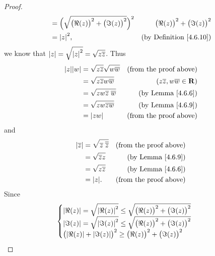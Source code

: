 \begin{proof}
\begin{align*}
                       & = \Big(\sqrt{\big(\Re(z)\big)^2 + \big(\Im(z)\big)^2}\Big)^2                                    & \big(\Re(z)\big)^2 + \big(\Im(z)\big)^2 \\
                       & = \abs{z}^2,                                                                                    & \text{(by Definition \ref{4.6.10})}
    \end{align*}
    we know that \(\left\lvert z\right\rvert = \sqrt{\left\lvert z\right\rvert^2} = \sqrt{z \overline{z}}\).
    Thus
    \begin{align*}
        \abs{z} \abs{w} & = \sqrt{z \overline{z}} \sqrt{w \overline{w}} & \text{(from the proof above)}           \\
                        & = \sqrt{z \overline{z} w \overline{w}}        & (z \overline{z}, w \overline{w} \in \R) \\
                        & = \sqrt{zw \overline{z} \; \overline{w}}      & \text{(by Lemma \ref{4.6.6})}           \\
                        & = \sqrt{zw \overline{zw}}                     & \text{(by Lemma \ref{4.6.9})}           \\
                        & = \abs{zw}                                    & \text{(from the proof above)}
    \end{align*}
    and
    \begin{align*}
        \abs{\overline{z}} & = \sqrt{\overline{z} \; \overline{\overline{z}}} & \text{(from the proof above)} \\
                           & = \sqrt{\overline{z} z}                          & \text{(by Lemma \ref{4.6.9})} \\
                           & = \sqrt{z \overline{z}}                          & \text{(by Lemma \ref{4.6.6})} \\
                           & = \abs{z}.                                       & \text{(from the proof above)}
    \end{align*}
    Since
    \begin{align*}
                 & \begin{cases}
                       \abs{\Re(z)} = \sqrt{\abs{\Re(z)}^2} \leq \sqrt{\big(\Re(z)\big)^2 + \big(\Im(z)\big)^2} \\
                       \abs{\Im(z)} = \sqrt{\abs{\Im(z)}^2} \leq \sqrt{\big(\Re(z)\big)^2 + \big(\Im(z)\big)^2} \\
                       \big(\abs{\Re(z)} + \abs{\Im(z)}\big)^2 \geq \big(\Re(z)\big)^2 + \big(\Im(z)\big)^2

\end{cases}
\end{align*}
\end{proof}
